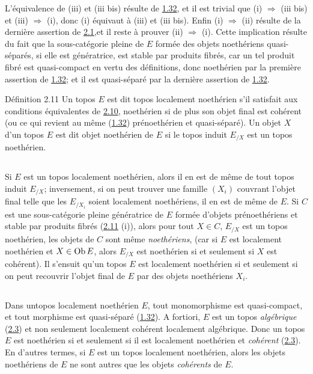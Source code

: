 \documentclass[10pt]{../fichiers-configuration-latex/smfart}
\begin{document}
L'équivalence de (iii) et (iii bis) résulte de \hyperref[VI.subsec1.32]{1.32},
et il est trivial que (i) $\Rightarrow$ (iii bis) et (iii)
$\Rightarrow$ (i), donc (i) équivaut à (iii) et (iii bis). Enfin (i)
$\Rightarrow$ (ii) résulte de la dernière assertion de
\hyperref[VI.prop2.1]{2.1},\pageoriginale et il reste à prouver (ii)
$\Rightarrow$ (i). Cette implication résulte du fait que la
sous-catégorie pleine de $E$ formée des objets noethériens
quasi-séparés, si elle est génératrice, est stable par produits
fibrés, car un tel produit fibré est quasi-compact en vertu des
définitions, donc noethérien par la première assertion de
\hyperref[VI.subsec1.32]{1.32}; et il est quasi-séparé par la dernière
assertion de \hyperref[VI.subsec1.32]{1.32}.

\begin{enonce*}{Définition 2.11}
Un topos $E$ est dit topos localement noethérien s'il satisfait aux
conditions équivalentes de \hyperref[VI.prop2.10]{2.10}, noethérien si de
plus son objet final
est cohérent (ou ce qui revient au même (\hyperref[VI.subsec1.32]{1.32})
prénoethérien et
quasi-séparé). Un objet $X$ d'un topos $E$ est dit objet
noethérien de
$E$ si le topos induit $E_{/X}$ est un topos noethérien.
\end{enonce*}

\setcounter{subsection}{11}
\subsection{}
Si $E$ est un topos localement noethérien, alors il en est de même de
tout topos induit $E_{/X}$; inversement, si on peut trouver une
famille $(X_i)$ couvrant l'objet final telle que les $E_{/X_i}$ soient
localement noethériens, il en est de même de $E$. Si $C$ est une
sous-catégorie pleine génératrice de $E$ formée d'objets
prénoethériens et stable par produits fibrés (\hyperref[VI.def2.11]{2.11} (i)), alors pour
tout $X \in C$, $E_{/X}$ est un topos noethérien, \ie les objets de
$C$ sont même \emph{noethériens}, (car si $E$ est localement
noethérien et $X \in \operatorname{Ob} E$, alors $E_{/X}$ est noethérien si et
seulement si $X$ est cohérent). Il s'ensuit qu'un topos $E$ est
localement noethérien si et seulement si on peut recouvrir l'objet
final de $E$ par des objets noethériens $X_i$.

\subsection{}
Dans un\pageoriginale topos localement noethérien $E$, tout monomorphisme est
quasi-compact, et tout morphisme est quasi-séparé (\hyperref[VI.subsec1.32]{1.32}). A fortiori,
$E$ est un topos \emph{algébrique} (\hyperref[VI.def2.3]{2.3}) et non seulement localement
cohérent \ie localement algébrique. Donc un topos $E$ est noethérien
si et seulement si il est localement noethérien et \emph{cohérent}
(\hyperref[VI.def2.3]{2.3}). En d'autres termes, si $E$ est un topos localement noethérien,
alors les objets noethériens de $E$ ne sont autres que les objets
\emph{cohérents} de $E$.
\end{document}
